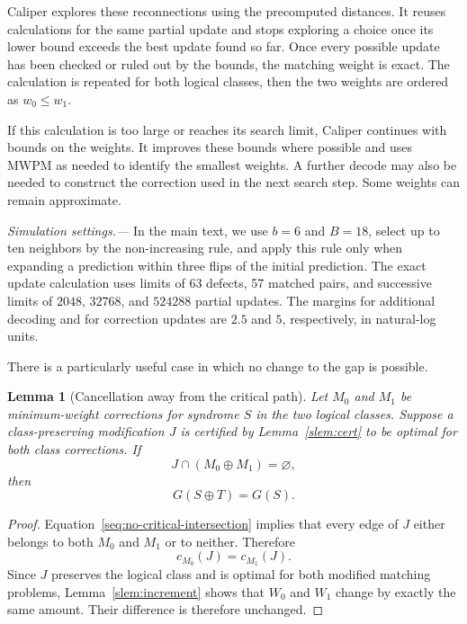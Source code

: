 \documentclass[
    reprint,
    amsmath,amssymb,
    nofootinbib,
    superscriptaddress,
    aps,
    noeprint,
    longbibliography,
    prl
]{revtex4-2}
\theoremstyle{plain}
\newtheorem{lemma}[theorem]{Lemma}
\begin{document}
Caliper explores these reconnections using the precomputed distances. It reuses calculations
for the same partial update and stops exploring a choice once its lower bound exceeds the best
update found so far. Once every possible update has been checked or ruled out by the bounds,
the matching weight is exact. The calculation is repeated for both logical classes, then the
two weights are ordered as $w_0\leq w_1$.

If this calculation is too large or reaches its search limit, Caliper continues with bounds
on the weights. It improves these bounds where possible and uses MWPM as needed to identify
the smallest weights. A further decode may also be needed to construct the correction used
in the next search step. Some weights can remain approximate.

\textit{Simulation settings.---} In the main text, we use $b=6$ and $B=18$, select up to ten
neighbors by the non-increasing rule, and apply this rule only when expanding a prediction
within three flips of the initial prediction. The exact update calculation uses limits of
63 defects, 57 matched pairs, and successive limits of $2048$, $32768$, and $524288$ partial
updates. The margins for additional decoding and for correction updates are $2.5$ and $5$,
respectively, in natural-log units.

There is a particularly useful case in which no change to the gap is possible.

\begin{lemma}[Cancellation away from the critical path]
    \label{slem:cancel}
    Let $M_0$ and $M_1$ be minimum-weight corrections for syndrome $S$ in the two logical classes.
    Suppose a class-preserving modification $J$ is certified by Lemma~\ref{slem:cert} to be optimal
    for both class corrections. If
    \begin{equation}
        J\cap(M_0\oplus M_1)=\varnothing,
        \label{seq:no-critical-intersection}
    \end{equation}
    then
    \begin{equation}
        G(S\oplus T)=G(S).
    \end{equation}
\end{lemma}

\begin{proof}
    Equation~\eqref{seq:no-critical-intersection} implies that every edge of $J$ either belongs to
    both $M_0$ and $M_1$ or to neither. Therefore
    \begin{equation}
        c_{M_0}(J)=c_{M_1}(J).
    \end{equation}
    Since $J$ preserves the logical class and is optimal for both modified matching problems,
    Lemma~\ref{slem:increment} shows that $W_0$ and $W_1$ change by exactly the same amount. Their
    difference is therefore unchanged.
\end{proof}
\end{document}
